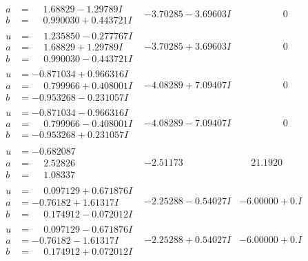 \documentclass[1p]{elsarticle_modified}
\theoremstyle{definition}
\begin{document}
$$\begin{array}{c|c|c}
\begin{aligned}
a &= \phantom{-}1.68829 - 1.29789 I \\
b &= \phantom{-}0.990030 + 0.443721 I\end{aligned}
 & -3.70285 - 3.69603 I & \phantom{-0.000000 } 0 \\ \hline\begin{aligned}
u &= \phantom{-}1.235850 - 0.277767 I \\
a &= \phantom{-}1.68829 + 1.29789 I \\
b &= \phantom{-}0.990030 - 0.443721 I\end{aligned}
 & -3.70285 + 3.69603 I & \phantom{-0.000000 } 0 \\ \hline\begin{aligned}
u &= -0.871034 + 0.966316 I \\
a &= \phantom{-}0.799966 + 0.408001 I \\
b &= -0.953268 - 0.231057 I\end{aligned}
 & -4.08289 + 7.09407 I & \phantom{-0.000000 } 0 \\ \hline\begin{aligned}
u &= -0.871034 - 0.966316 I \\
a &= \phantom{-}0.799966 - 0.408001 I \\
b &= -0.953268 + 0.231057 I\end{aligned}
 & -4.08289 - 7.09407 I & \phantom{-0.000000 } 0 \\ \hline\begin{aligned}
u &= -0.682087\phantom{ +0.000000I} \\
a &= \phantom{-}2.52826\phantom{ +0.000000I} \\
b &= \phantom{-}1.08337\phantom{ +0.000000I}\end{aligned}
 & -2.51173\phantom{ +0.000000I} & \phantom{-}21.1920\phantom{ +0.000000I} \\ \hline\begin{aligned}
u &= \phantom{-}0.097129 + 0.671876 I \\
a &= -0.76182 + 1.61317 I \\
b &= \phantom{-}0.174912 - 0.072012 I\end{aligned}
 & -2.25288 - 0.54027 I & -6.00000 + 0. I\phantom{ +0.000000I} \\ \hline\begin{aligned}
u &= \phantom{-}0.097129 - 0.671876 I \\
a &= -0.76182 - 1.61317 I \\
b &= \phantom{-}0.174912 + 0.072012 I\end{aligned}
 & -2.25288 + 0.54027 I & -6.00000 + 0. I\phantom{ +0.000000I} \\ \hline\begin{aligned}

\end{aligned}
\end{array}$$
\end{document}
